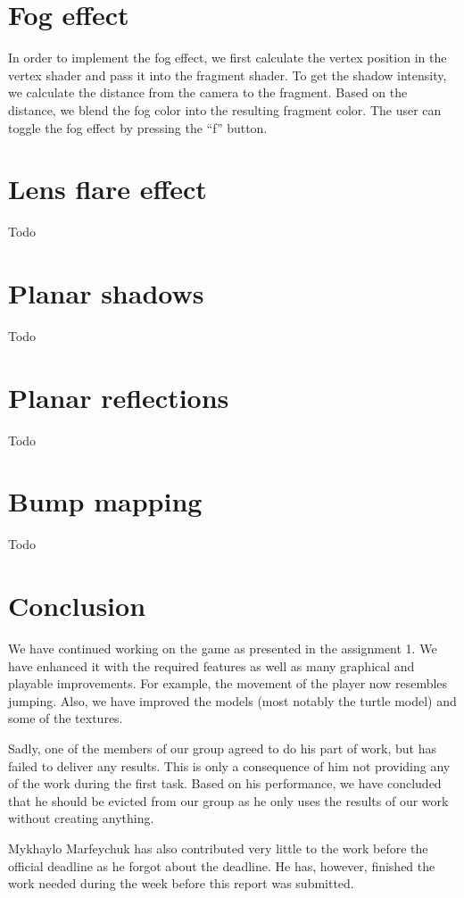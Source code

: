 \documentclass[a4paper,10pt]{article}
\begin{document}
\section{Fog effect}
In order to implement the fog effect, we first calculate the vertex position in the vertex shader and pass it into the fragment shader. To get the shadow intensity, we calculate the distance from the camera to the fragment. Based on the distance, we blend the fog color into the resulting fragment color. The user can toggle the fog effect by pressing the ``f'' button.

\section{Lens flare effect}
Todo

\section{Planar shadows}
Todo

\section{Planar reflections}
Todo

\section{Bump mapping}
Todo

\section*{Conclusion}
We have continued working on the game as presented in the assignment 1. We have enhanced it with the required features as well as many graphical and playable improvements. For example, the movement of the player now resembles jumping. Also, we have improved the models (most notably the turtle model) and some of the textures.

Sadly, one of the members of our group agreed to do his part of work, but has failed to deliver any results. This is only a consequence of him not providing any of the work during the first task. Based on his performance, we have concluded that he should be evicted from our group as he only uses the results of our work without creating anything.

Mykhaylo Marfeychuk has also contributed very little to the work before the official deadline as he forgot about the deadline. He has, however, finished the work needed during the week before this report was submitted.
\end{document}
